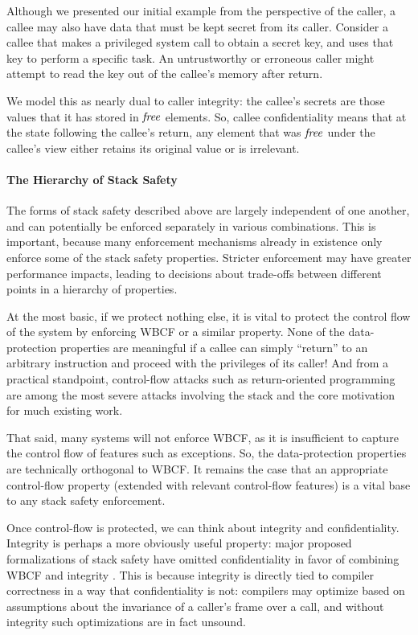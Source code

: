 \documentclass[10pt,conference]{ieeetran}%
\theoremstyle{definition}
\begin{document}
Although we presented our initial example from the perspective of the caller, a callee
may also have data that must be kept secret from its caller. Consider a callee that makes
a privileged system call to obtain a secret key, and uses that key to perform a specific
task. An untrustworthy or erroneous caller might attempt to read the key out of the callee's
memory after return.

We model this as nearly dual to caller integrity: the callee's secrets are those
values that it has stored in \(\mathit{free}\) elements. So, callee confidentiality means that
at the state following the callee's return, any element that was \(\mathit{free}\) under the
callee's view either retains its original value or is irrelevant.

\paragraph*{The Hierarchy of Stack Safety}

The forms of stack safety described above are largely independent of one another, and
can potentially be enforced separately in various combinations. This is important, because
many enforcement mechanisms already in existence only enforce some of the stack safety
properties. Stricter enforcement may have greater performance impacts, leading to decisions
about trade-offs between different points in a hierarchy of properties.

At the most basic, if we protect nothing else, it is vital to protect the control flow of the
system by enforcing WBCF or a similar property. None of the data-protection properties are
meaningful if a callee can simply ``return'' to an arbitrary instruction and proceed with
the privileges of its caller! And from a practical standpoint, control-flow attacks such
as return-oriented programming are among the most severe attacks involving the stack and
the core motivation for much existing work.

That said, many systems will not enforce WBCF, as it is insufficient to capture the
control flow of features such as exceptions. So, the data-protection properties are
technically orthogonal to WBCF. It remains the case that an appropriate control-flow
property (extended with relevant control-flow features) is a vital base to any stack safety
enforcement.

Once control-flow is protected, we can think about integrity and confidentiality.
Integrity is perhaps a more obviously useful property: major proposed formalizations
of stack safety have omitted confidentiality in favor of combining WBCF and integrity
\cite{SkorstengaardSTKJFP}. This is because integrity is directly tied to compiler correctness
in a way that confidentiality is not: compilers may optimize based on assumptions
about the invariance of a caller's frame over a call, and without integrity such optimizations
are in fact unsound.
\end{document}
